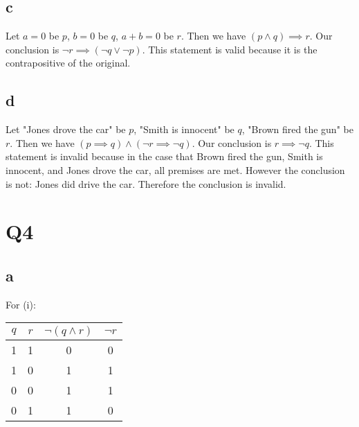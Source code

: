 \documentclass[12pt]{article}
\begin{document}
\subsection{c}
Let $a = 0$ be $p$, $b = 0$ be $q$, $a+b =0$ be $r$.
\newline
Then we have $(p \land q) \implies r$. Our conclusion is $\neg r \implies (\neg q \lor \neg p)$.
\newline
This statement is valid because it is the contrapositive of the original.

\subsection{d}
Let "Jones drove the car" be $p$, "Smith is innocent" be $q$, 
"Brown fired the gun" be $r$.
\newline
Then we have $(p \implies q) \land (\neg r \implies \neg q)$. Our conclusion is $r \implies \neg q$.
\newline
This statement is invalid because in the case that Brown fired the gun, Smith is innocent, and Jones drove the car, 
all premises are met. However the conclusion is not: Jones did drive the car. Therefore the conclusion 
is invalid.


\section{Q4}
\subsection{a}
For (i):
\newline
\begin{tabular}{ | c | c | c | c |}
    \hline
    $q$ & $r$ & $\neg(q \land r)$ & $\neg r$ \\
    \hline
    1 & 1 & 0 & 0 \\
    \hline
    1 & 0 & 1 & 1 \\
    \hline
    0 & 0 & 1 & 1 \\
    \hline
    0 & 1 & 1 & 0 \\
    \hline
\end{tabular}
\newline
\end{document}
